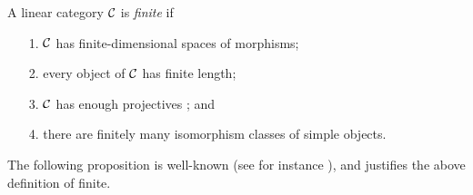 \documentclass{amsart}
\begin{document}
\begin{definition} %
	A linear category $\mathcal C$ is {\em finite} if 
	\begin{enumerate}
		\item[1.] $\mathcal C$ has finite-dimensional spaces of morphisms;
		\item[2.] every object of $\mathcal C$ has finite length;
		\item[3.] $\mathcal C$ has enough projectives%
		; and
		\item[4.] there are finitely many isomorphism classes of simple objects.  
	\end{enumerate}
\end{definition}

The following proposition is well-known (see for instance \cite[\S9.6]{MR2808160}), and justifies the above definition of finite.
\end{document}
